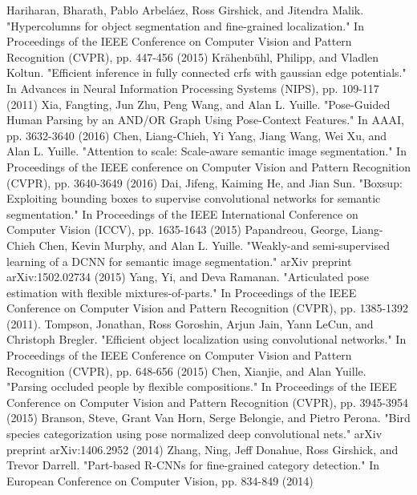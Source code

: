\begin{thebibliography}{}
Hariharan, Bharath, Pablo Arbeláez, Ross Girshick, and Jitendra Malik. "Hypercolumns for object segmentation and fine-grained localization." In Proceedings of the IEEE Conference on Computer Vision and Pattern Recognition (CVPR), pp. 447-456 (2015)
Krähenbühl, Philipp, and Vladlen Koltun. "Efficient inference in fully connected crfs with gaussian edge potentials." In Advances in Neural Information Processing Systems (NIPS), pp. 109-117 (2011)
Xia, Fangting, Jun Zhu, Peng Wang, and Alan L. Yuille. "Pose-Guided Human Parsing by an AND/OR Graph Using Pose-Context Features." In AAAI, pp. 3632-3640 (2016)
Chen, Liang-Chieh, Yi Yang, Jiang Wang, Wei Xu, and Alan L. Yuille. "Attention to scale: Scale-aware semantic image segmentation." In Proceedings of the IEEE conference on Computer Vision and Pattern Recognition (CVPR), pp. 3640-3649 (2016)
%
Dai, Jifeng, Kaiming He, and Jian Sun. "Boxsup: Exploiting bounding boxes to supervise convolutional networks for semantic segmentation." In Proceedings of the IEEE International Conference on Computer Vision (ICCV), pp. 1635-1643 (2015)
Papandreou, George, Liang-Chieh Chen, Kevin Murphy, and Alan L. Yuille. "Weakly-and semi-supervised learning of a DCNN for semantic image segmentation." arXiv preprint arXiv:1502.02734 (2015)
%
Yang, Yi, and Deva Ramanan. "Articulated pose estimation with flexible mixtures-of-parts." In Proceedings of the IEEE Conference on Computer Vision and Pattern Recognition (CVPR), pp. 1385-1392 (2011).
Tompson, Jonathan, Ross Goroshin, Arjun Jain, Yann LeCun, and Christoph Bregler. "Efficient object localization using convolutional networks." In Proceedings of the IEEE Conference on Computer Vision and Pattern Recognition (CVPR), pp. 648-656 (2015)
Chen, Xianjie, and Alan Yuille. "Parsing occluded people by flexible compositions." In Proceedings of the IEEE Conference on Computer Vision and Pattern Recognition (CVPR), pp. 3945-3954 (2015)
%
Branson, Steve, Grant Van Horn, Serge Belongie, and Pietro Perona. "Bird species categorization using pose normalized deep convolutional nets." arXiv preprint arXiv:1406.2952 (2014)
Zhang, Ning, Jeff Donahue, Ross Girshick, and Trevor Darrell. "Part-based R-CNNs for fine-grained category detection." In European Conference on Computer Vision, pp. 834-849 (2014)

\end{thebibliography}
